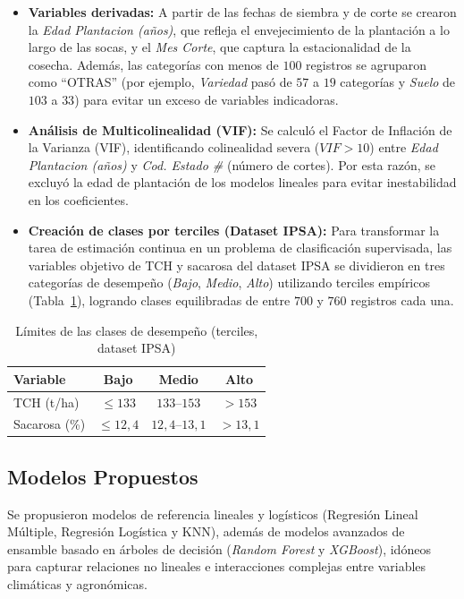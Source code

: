 \documentclass[conference]{IEEEtran}
\begin{document}
\begin{itemize}
    \item \textbf{Variables derivadas:} A partir de las fechas de siembra y de corte se crearon la \textit{Edad Plantacion (años)}, que refleja el envejecimiento de la plantación a lo largo de las socas, y el \textit{Mes Corte}, que captura la estacionalidad de la cosecha. Además, las categorías con menos de $100$ registros se agruparon como ``OTRAS'' (por ejemplo, \textit{Variedad} pasó de $57$ a $19$ categorías y \textit{Suelo} de $103$ a $33$) para evitar un exceso de variables indicadoras.
    \item \textbf{Análisis de Multicolinealidad (VIF):} Se calculó el Factor de Inflación de la Varianza (VIF), identificando colinealidad severa ($VIF > 10$) entre \textit{Edad Plantacion (años)} y \textit{Cod. Estado \#} (número de cortes). Por esta razón, se excluyó la edad de plantación de los modelos lineales para evitar inestabilidad en los coeficientes.
    \item \textbf{Creación de clases por terciles (Dataset IPSA):} Para transformar la tarea de estimación continua en un problema de clasificación supervisada, las variables objetivo de TCH y sacarosa del dataset IPSA se dividieron en tres categorías de desempeño (\textit{Bajo}, \textit{Medio}, \textit{Alto}) utilizando terciles empíricos (Tabla~\ref{tab:clases}), logrando clases equilibradas de entre $700$ y $760$ registros cada una.
\end{itemize}

\begin{table}[!t]
\caption{Límites de las clases de desempeño (terciles, dataset IPSA)}
\label{tab:clases}
\centering
\begin{tabular}{lccc}
\toprule
Variable & Bajo & Medio & Alto \\
\midrule
TCH (t/ha)      & $\leq 133$  & $133$--$153$    & $> 153$ \\
Sacarosa (\%)   & $\leq 12{,}4$ & $12{,}4$--$13{,}1$ & $> 13{,}1$ \\
\bottomrule
\end{tabular}
\end{table}

\subsection{Modelos Propuestos}
Se propusieron modelos de referencia lineales y logísticos (Regresión Lineal Múltiple, Regresión Logística y KNN), además de modelos avanzados de ensamble basado en árboles de decisión (\textit{Random Forest} y \textit{XGBoost}), idóneos para capturar relaciones no lineales e interacciones complejas entre variables climáticas y agronómicas.
\end{document}
